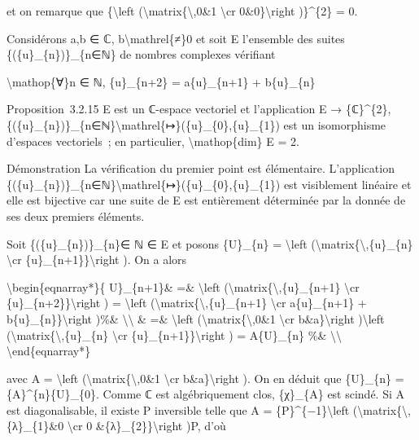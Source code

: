 \documentclass[]{article}
\begin{document}
et on remarque que \{\textbackslash{}left
(\textbackslash{}matrix\{\textbackslash{},0\&1 \textbackslash{}cr
0\&0\}\textbackslash{}right )\}\^{}\{2\} = 0.

Considérons a,b ∈ ℂ, b\textbackslash{}mathrel\{≠\}0 et soit E l'ensemble
des suites \{(\{u\}\_\{n\})\}\_\{n∈ℕ\} de nombres complexes vérifiant

\textbackslash{}mathop\{∀\}n ∈ ℕ, \{u\}\_\{n+2\} = a\{u\}\_\{n+1\} +
b\{u\}\_\{n\}

Proposition~3.2.15 E est un ℂ-espace vectoriel et l'application E →
\{ℂ\}\^{}\{2\},
\{(\{u\}\_\{n\})\}\_\{n∈ℕ\}\textbackslash{}mathrel\{↦\}(\{u\}\_\{0\},\{u\}\_\{1\})
est un isomorphisme d'espaces vectoriels~; en particulier,
\textbackslash{}mathop\{dim\} E = 2.

Démonstration La vérification du premier point est élémentaire.
L'application
\{(\{u\}\_\{n\})\}\_\{n∈ℕ\}\textbackslash{}mathrel\{↦\}(\{u\}\_\{0\},\{u\}\_\{1\})
est visiblement linéaire et elle est bijective car une suite de E est
entièrement déterminée par la donnée de ses deux premiers éléments.

Soit \{(\{u\}\_\{n\})\}\_\{n\}∈ ℕ ∈ E et posons \{U\}\_\{n\} =
\textbackslash{}left
(\textbackslash{}matrix\{\textbackslash{},\{u\}\_\{n\}
\textbackslash{}cr \{u\}\_\{n+1\}\}\textbackslash{}right ). On a alors

\textbackslash{}begin\{eqnarray*\}\{ U\}\_\{n+1\}\& =\&
\textbackslash{}left
(\textbackslash{}matrix\{\textbackslash{},\{u\}\_\{n+1\}
\textbackslash{}cr \{u\}\_\{n+2\}\}\textbackslash{}right ) =
\textbackslash{}left
(\textbackslash{}matrix\{\textbackslash{},\{u\}\_\{n+1\}
\textbackslash{}cr a\{u\}\_\{n+1\} +
b\{u\}\_\{n\}\}\textbackslash{}right )\%\&
\textbackslash{}\textbackslash{} \& =\& \textbackslash{}left
(\textbackslash{}matrix\{\textbackslash{},0\&1 \textbackslash{}cr
b\&a\}\textbackslash{}right )\textbackslash{}left
(\textbackslash{}matrix\{\textbackslash{},\{u\}\_\{n\}
\textbackslash{}cr \{u\}\_\{n+1\}\}\textbackslash{}right ) =
A\{U\}\_\{n\} \%\& \textbackslash{}\textbackslash{}
\textbackslash{}end\{eqnarray*\}

avec A = \textbackslash{}left
(\textbackslash{}matrix\{\textbackslash{},0\&1 \textbackslash{}cr
b\&a\}\textbackslash{}right ). On en déduit que \{U\}\_\{n\} =
\{A\}\^{}\{n\}\{U\}\_\{0\}. Comme ℂ est algébriquement clos,
\{χ\}\_\{A\} est scindé. Si A est diagonalisable, il existe P inversible
telle que A = \{P\}\^{}\{−1\}\textbackslash{}left
(\textbackslash{}matrix\{\textbackslash{},\{λ\}\_\{1\}\&0
\textbackslash{}cr 0 \&\{λ\}\_\{2\}\}\textbackslash{}right )P, d'où
\end{document}
